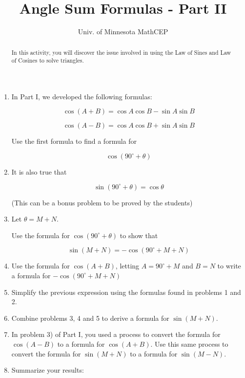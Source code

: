 \documentclass[number]{ximera}
\title{Angle Sum Formulas - Part II}
\author{Univ. of Minnesota MathCEP}
\begin{document}
\begin{abstract}
  In this activity, you will discover the issue involved in using the Law of Sines and Law of Cosines to solve triangles.
\end{abstract}

\maketitle

\begin{enumerate}

\item In Part I, we developed the following formulas:

\[ \cos(A+B) = \cos A \cos B - \sin A \sin B \]

\[ \cos(A-B) = \cos A \cos B + \sin A \sin B \]

Use the first formula to find a formula for

\[ \cos(90^\circ + \theta) \]

\item

It is also true that 

\[ \sin(90^\circ + \theta) = \cos \theta \]

(This can be a bonus problem to be proved by the students)

\item Let $\theta = M+N$. 

Use the formula for $\cos(90^\circ + \theta)$ to show that

\[\sin(M+N) = - \cos(90^\circ + M + N) \]

\item Use the formula for $\cos(A+B)$, letting $A = 90^\circ + M$ and $B = N$ to write a formula for $ - \cos(90^\circ + M + N) $

\item Simplify the previous expression using the formulas found in problems 1 and 2.

\item Combine problems 3, 4 and 5 to derive a formula for $\sin(M+N)$.

\item In problem 3) of Part I, you used a process to convert the formula for $\cos(A-B)$ to a formula for $\cos(A+B)$. Use this same process to convert the formula for $\sin(M+N)$ to a formula for $\sin(M-N)$.

\newpage

\item Summarize your results:


\end{enumerate}
\end{document}
